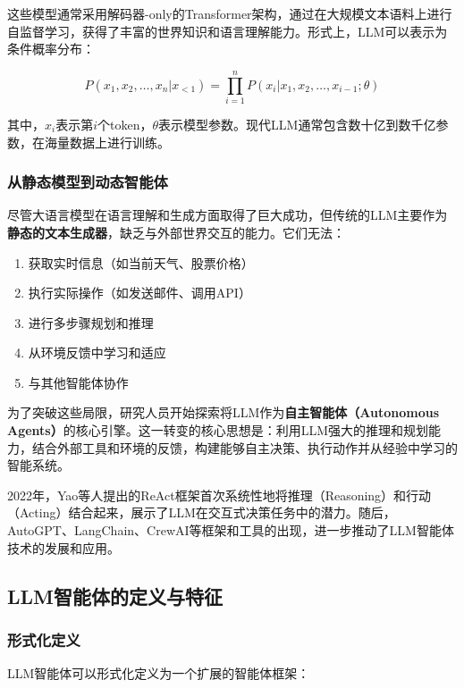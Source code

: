 这些模型通常采用解码器-only的Transformer架构，通过在大规模文本语料上进行自监督学习，获得了丰富的世界知识和语言理解能力。形式上，LLM可以表示为条件概率分布：

\begin{equation}\label{eq:llm_basic}
    P(x_1, x_2, \ldots, x_n | x_{<1}) = \prod_{i=1}^{n} P(x_i | x_1, x_2, \ldots, x_{i-1}; \theta)
\end{equation}

其中，$x_i$表示第$i$个token，$\theta$表示模型参数。现代LLM通常包含数十亿到数千亿参数，在海量数据上进行训练。

\subsubsection{从静态模型到动态智能体}

尽管大语言模型在语言理解和生成方面取得了巨大成功，但传统的LLM主要作为\textbf{静态的文本生成器}，缺乏与外部世界交互的能力。它们无法：

\begin{enumerate}[leftmargin=2em]
    \item 获取实时信息（如当前天气、股票价格）
    \item 执行实际操作（如发送邮件、调用API）
    \item 进行多步骤规划和推理
    \item 从环境反馈中学习和适应
    \item 与其他智能体协作
\end{enumerate}

为了突破这些局限，研究人员开始探索将LLM作为\textbf{自主智能体（Autonomous Agents）}的核心引擎。这一转变的核心思想是：利用LLM强大的推理和规划能力，结合外部工具和环境的反馈，构建能够自主决策、执行动作并从经验中学习的智能系统。

2022年，Yao等人提出的ReAct框架首次系统性地将推理（Reasoning）和行动（Acting）结合起来，展示了LLM在交互式决策任务中的潜力。随后，AutoGPT、LangChain、CrewAI等框架和工具的出现，进一步推动了LLM智能体技术的发展和应用。

\subsection{LLM智能体的定义与特征}

\subsubsection{形式化定义}

LLM智能体可以形式化定义为一个扩展的智能体框架：

